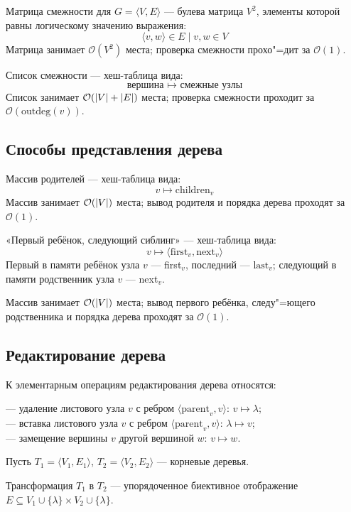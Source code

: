 {\bold Матрица смежности} для $G=\langle V,E\rangle$ --- булева матрица $V^2$, элементы которой равны логическому значению выражения:
$$\langle v,w\rangle\in E\mid v,w\in V$$
Матрица занимает $\mathcal{O}(V^2)$ места; проверка смежности прохо"=дит за $\mathcal{O}(1)$.

{\bold Список смежности} --- хеш-таблица вида:
$$\text{вершина }\mapsto\text{ смежные узлы}$$
Список занимает $\mathcal{O}(\left|V\right|+\left|E\right|)$ места; проверка смежности проходит за $\mathcal{O}(\text{outdeg}(v))$.

\subsection{Способы представления дерева}

{\bold Массив родителей} --- хеш-таблица вида:
$$v\mapsto\text{children}_v$$
Массив занимает $\mathcal{O}(\left|V\right|)$ места; вывод родителя и порядка дерева проходят за $\mathcal{O}(1)$.

{\bold «Первый ребёнок, следующий сиблинг»} --- хеш-таблица вида:
$$v\mapsto\langle\text{first}_v,\text{next}_v\rangle$$
{\ital Первый} в памяти ребёнок узла $v$ --- first$_v$, {\ital последний} --- $\text{last}_v$; {\ital следующий} в памяти родственник узла $v$ --- next$_v$.

Массив занимает $\mathcal{O}(\left|V\right|)$ места; вывод первого ребёнка, следу"=ющего родственника и порядка дерева проходят за $\mathcal{O}(1)$.

\subsection{Редактирование дерева}

К {\bold элементарным операциям} редактирования дерева относятся:

--- {\ital удаление} листового узла $v$ с ребром $\langle\text{parent}_v,v\rangle$: $v\mapsto\lambda$;\\
--- {\ital вставка} листового узла $v$ с ребром $\langle\text{parent}_v,v\rangle$: $\lambda\mapsto v$;\\
--- {\ital замещение} вершины $v$ другой вершиной $w$: $v\mapsto w$.

Пусть $T_1=\langle V_1,E_1\rangle$, $T_2=\langle V_2,E_2\rangle$ --- корневые деревья.

{\ital Трансформация} $T_1$ в $T_2$ --- упорядоченное биективное отображение $E\subseteq V_1\cup\{\lambda\}\times V_2\cup\{\lambda\}$.

